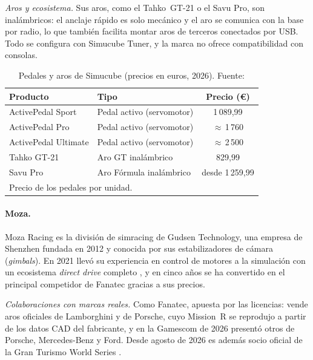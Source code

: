 \textit{Aros y ecosistema.} Sus aros, como el Tahko~GT-21 o el Savu Pro, son inalámbricos: el anclaje rápido es solo mecánico y el aro se comunica con la base por radio, lo que también facilita montar aros de terceros conectados por USB. Todo se configura con Simucube Tuner, y la marca no ofrece compatibilidad con consolas.

\begin{table}[htbp]
	\centering
	\caption[Pedales y aros de Simucube (precios en euros, 2026)]{Pedales y aros de Simucube (precios en euros, 2026). Fuente: \parencite{simucube_web}}
	\label{tab:simucube-otros}
	\small
	\begin{tabular}{|l|l|c|}
		\hline
		\textbf{Producto} & \textbf{Tipo} & \textbf{Precio (\euro)} \\
		\hline
		ActivePedal Sport        & Pedal activo (servomotor) & 1\,089,99 \\
		ActivePedal Pro          & Pedal activo (servomotor) & $\approx$\,1\,760 \\
		ActivePedal Ultimate     & Pedal activo (servomotor) & $\approx$\,2\,500 \\
		Tahko GT-21              & Aro GT inalámbrico        & 829,99 \\
		Savu Pro                 & Aro Fórmula inalámbrico   & desde 1\,259,99 \\
		\hline
		\multicolumn{3}{l}{\footnotesize Precio de los pedales por unidad.} \\
	\end{tabular}
\end{table}

\paragraph{Moza.}
Moza Racing es la división de simracing de Gudsen Technology, una empresa de Shenzhen fundada en 2012 y conocida por sus estabilizadores de cámara (\textit{gimbals}). En 2021 llevó su experiencia en control de motores a la simulación con un ecosistema \textit{direct drive} completo \parencite{moza_web}, y en cinco años se ha convertido en el principal competidor de Fanatec gracias a sus precios.

\textit{Colaboraciones con marcas reales.} Como Fanatec, apuesta por las licencias: vende aros oficiales de Lamborghini y de Porsche, cuyo Mission~R se reprodujo a partir de los datos CAD del fabricante, y en la Gamescom de 2026 presentó otros de Porsche, Mercedes-Benz y Ford. Desde agosto de 2026 es además socio oficial de la Gran Turismo World Series \parencite{moza_web}.

